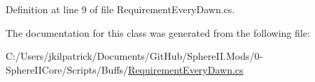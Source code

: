 Definition at line 9 of file Requirement\+Every\+Dawn.\+cs.



The documentation for this class was generated from the following file\+:\begin{DoxyCompactItemize}
\item 
C\+:/\+Users/jkilpatrick/\+Documents/\+Git\+Hub/\+Sphere\+I\+I.\+Mods/0-\/\+Sphere\+I\+I\+Core/\+Scripts/\+Buffs/\mbox{\hyperlink{_requirement_every_dawn_8cs}{Requirement\+Every\+Dawn.\+cs}}\end{DoxyCompactItemize}
